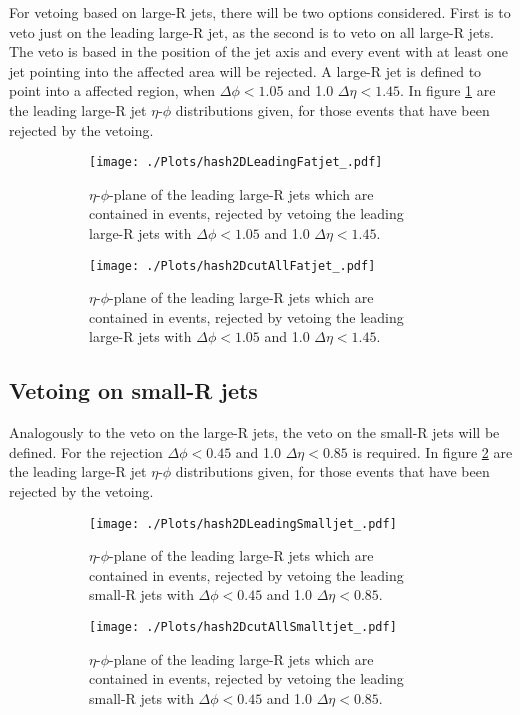 For vetoing based on large-R jets, there will be two options considered.
First is to veto just on the leading large-R jet, as the second is to veto on all large-R jets.
The veto is based in the position of the jet axis and every event with at least one jet pointing into the affected area will be rejected.
A large-R jet is defined to point into a affected region, when $\Delta\phi < 1.05$ and 1.0  $\Delta\eta < 1.45$.
In figure \ref{leadingLargeCut} are the leading large-R jet $\eta$-$\phi$ distributions given, for those events that have been rejected by the vetoing.
\begin{figure}[H]
	\centering
	\begin{subfigure}{0.45\textwidth}
		\texttt{[image: ./Plots/hash2DLeadingFatjet\_.pdf]}
		\caption{$\eta$-$\phi$-plane of the leading large-R jets which are contained in events, rejected by vetoing the leading large-R jets with $\Delta\phi < 1.05$ and 1.0  $\Delta\eta < 1.45$.}
	\end{subfigure}
	\begin{subfigure}{0.45\textwidth}
		\texttt{[image: ./Plots/hash2DcutAllFatjet\_.pdf]}
		\caption{$\eta$-$\phi$-plane of the leading large-R jets which are contained in events, rejected by vetoing the leading large-R jets with $\Delta\phi < 1.05$ and 1.0  $\Delta\eta < 1.45$.}
	\end{subfigure}
	\caption{}\label{leadingLargeCut}
\end{figure}

\subsection{Vetoing on small-R jets}

Analogously to the veto on the large-R jets, the veto on the small-R jets will be defined.
For the rejection $\Delta\phi < 0.45$ and 1.0  $\Delta\eta < 0.85$ is required.
In figure \ref{leadingSmallCut} are the leading large-R jet $\eta$-$\phi$ distributions given, for those events that have been rejected by the vetoing.
\begin{figure}[H]
	\centering
	\begin{subfigure}{0.45\textwidth}
		\texttt{[image: ./Plots/hash2DLeadingSmalljet\_.pdf]}
		\caption{$\eta$-$\phi$-plane of the leading large-R jets which are contained in events, rejected by vetoing the leading small-R jets with $\Delta\phi < 0.45$ and 1.0  $\Delta\eta < 0.85$.}
	\end{subfigure}
	\begin{subfigure}{0.45\textwidth}
		\texttt{[image: ./Plots/hash2DcutAllSmalltjet\_.pdf]}
		\caption{$\eta$-$\phi$-plane of the leading large-R jets which are contained in events, rejected by vetoing the leading small-R jets with $\Delta\phi < 0.45$ and 1.0  $\Delta\eta < 0.85$.}
	\end{subfigure}
	\caption{}\label{leadingSmallCut}
\end{figure}

